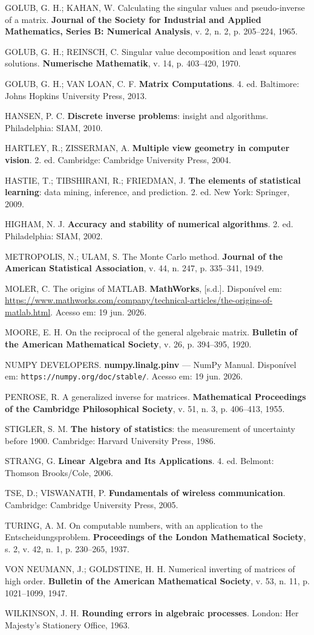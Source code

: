 \documentclass[12pt,a4paper,oneside]{report}
\begin{document}
GOLUB, G. H.; KAHAN, W. Calculating the singular values and pseudo-inverse of a matrix.
\textbf{Journal of the Society for Industrial and Applied Mathematics, Series B: Numerical
Analysis}, v. 2, n. 2, p. 205--224, 1965.

GOLUB, G. H.; REINSCH, C. Singular value decomposition and least squares solutions.
\textbf{Numerische Mathematik}, v. 14, p. 403--420, 1970.

GOLUB, G. H.; VAN LOAN, C. F. \textbf{Matrix Computations}. 4. ed. Baltimore: Johns Hopkins
University Press, 2013.

HANSEN, P. C. \textbf{Discrete inverse problems}: insight and algorithms. Philadelphia: SIAM,
2010.

HARTLEY, R.; ZISSERMAN, A. \textbf{Multiple view geometry in computer vision}. 2. ed. Cambridge:
Cambridge University Press, 2004.

HASTIE, T.; TIBSHIRANI, R.; FRIEDMAN, J. \textbf{The elements of statistical learning}: data
mining, inference, and prediction. 2. ed. New York: Springer, 2009.

HIGHAM, N. J. \textbf{Accuracy and stability of numerical algorithms}. 2. ed. Philadelphia: SIAM,
2002.

METROPOLIS, N.; ULAM, S. The Monte Carlo method. \textbf{Journal of the American Statistical
Association}, v. 44, n. 247, p. 335--341, 1949.

MOLER, C. The origins of MATLAB. \textbf{MathWorks}, [s.d.]. Disponível em:
\url{https://www.mathworks.com/company/technical-articles/the-origins-of-matlab.html}.
Acesso em: 19 jun. 2026.

MOORE, E. H. On the reciprocal of the general algebraic matrix. \textbf{Bulletin of the
American Mathematical Society}, v. 26, p. 394--395, 1920.

NUMPY DEVELOPERS. \textbf{numpy.linalg.pinv} --- NumPy Manual. Disponível em:
\texttt{https://numpy.org/doc/stable/}. Acesso em: 19 jun. 2026.

PENROSE, R. A generalized inverse for matrices. \textbf{Mathematical Proceedings of the
Cambridge Philosophical Society}, v. 51, n. 3, p. 406--413, 1955.

STIGLER, S. M. \textbf{The history of statistics}: the measurement of uncertainty before 1900.
Cambridge: Harvard University Press, 1986.

STRANG, G. \textbf{Linear Algebra and Its Applications}. 4. ed. Belmont: Thomson Brooks/Cole,
2006.

TSE, D.; VISWANATH, P. \textbf{Fundamentals of wireless communication}. Cambridge: Cambridge
University Press, 2005.

TURING, A. M. On computable numbers, with an application to the Entscheidungsproblem.
\textbf{Proceedings of the London Mathematical Society}, s. 2, v. 42, n. 1, p. 230--265, 1937.

VON NEUMANN, J.; GOLDSTINE, H. H. Numerical inverting of matrices of high order. \textbf{Bulletin
of the American Mathematical Society}, v. 53, n. 11, p. 1021--1099, 1947.

WILKINSON, J. H. \textbf{Rounding errors in algebraic processes}. London: Her Majesty's Stationery
Office, 1963.

\endgroup
\end{document}
